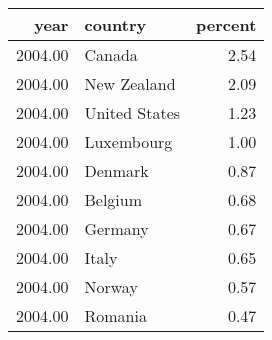 \begin{table}[ht]
\centering
\begin{tabular}{rlr}
  \hline
year & country & percent \\ 
  \hline
2004.00 & Canada & 2.54 \\ 
  2004.00 & New Zealand & 2.09 \\ 
  2004.00 & United States & 1.23 \\ 
  2004.00 & Luxembourg & 1.00 \\ 
  2004.00 & Denmark & 0.87 \\ 
  2004.00 & Belgium & 0.68 \\ 
  2004.00 & Germany & 0.67 \\ 
  2004.00 & Italy & 0.65 \\ 
  2004.00 & Norway & 0.57 \\ 
  2004.00 & Romania & 0.47 \\ 
   \hline
\end{tabular}
\end{table}
